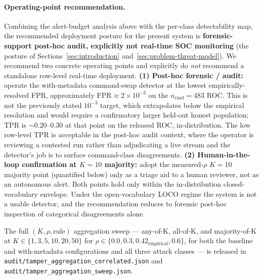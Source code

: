 \documentclass[sensors,article,submit,moreauthors,pdftex]{Definitions/mdpi}
\begin{document}
\paragraph{Operating-point recommendation.} Combining the alert-budget analysis above with the per-class detectability map, the recommended deployment posture for the present system is \textbf{forensic-support post-hoc audit, explicitly not real-time SOC monitoring} (the posture of Sections~\ref{sec:introduction} and~\ref{sec:problem-threat-model}). We recommend two concrete operating points and explicitly do \emph{not} recommend a standalone row-level real-time deployment. \textbf{(1) Post-hoc forensic / audit:} operate the with-metadata command-swap detector at the lowest empirically-resolved FPR, approximately $\mathrm{FPR}\!\approx\!2\!\times\!10^{-3}$ on the $n_{\text{cmd}}\!=\!483$ ROC. This is not the previously stated $10^{-3}$ target, which extrapolates below the empirical resolution and would require a confirmatory larger held-out honest population; TPR is $\sim 0.20$--$0.30$ at that point on the released ROC, in-distribution. The low row-level TPR is acceptable in the post-hoc audit context, where the operator is reviewing a contested run rather than adjudicating a live stream and the detector's job is to surface command-class disagreements. \textbf{(2) Human-in-the-loop confirmation at $K\!=\!10$ majority:} adopt the measured-$\rho$ $K\!=\!10$ majority point (quantified below) only as a triage aid to a human reviewer, not as an autonomous alert. Both points hold only within the in-distribution closed-vocabulary envelope. Under the open-vocabulary LOCO regime the system is not a usable detector, and the recommendation reduces to forensic post-hoc inspection of categorical disagreements alone.

The full $(K,\rho,\text{rule})$ aggregation sweep --- any-of-K, all-of-K, and majority-of-K at $K\in\{1,3,5,10,20,50\}$ for $\rho\in\{0.0,0.3,0.42_{\text{empirical}},0.6\}$, for both the baseline and with-metadata configurations and all three attack classes --- is released in \texttt{audit/tamper\_aggregation\_correlated.json} and \texttt{audit/tamper\_aggregation\_sweep.json}.
\end{document}
